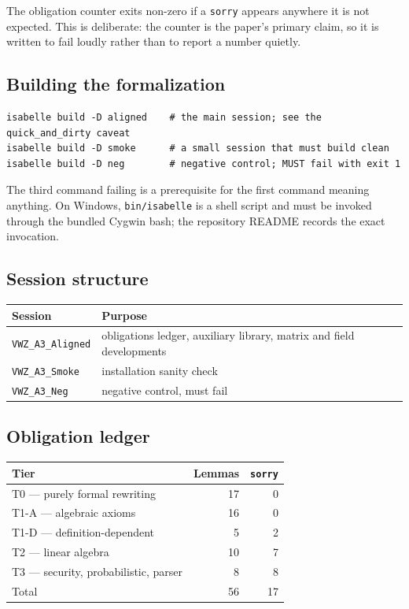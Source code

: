 The obligation counter exits non-zero if a \texttt{sorry} appears anywhere it is
not expected. This is deliberate: the counter is the paper's primary claim, so it
is written to fail loudly rather than to report a number quietly.

\subsection{Building the formalization}

\begin{lstlisting}
isabelle build -D aligned    # the main session; see the quick_and_dirty caveat
isabelle build -D smoke      # a small session that must build clean
isabelle build -D neg        # negative control; MUST fail with exit 1
\end{lstlisting}

The third command failing is a prerequisite for the first command meaning
anything. On Windows, \texttt{bin/isabelle} is a shell script and must be invoked
through the bundled Cygwin bash; the repository README records the exact
invocation.

\subsection{Session structure}

\begin{center}
\begin{tabular}{@{}ll@{}}
\toprule
Session & Purpose \\
\midrule
\texttt{VWZ\_A3\_Aligned} & obligations ledger, auxiliary library, matrix and field developments \\
\texttt{VWZ\_A3\_Smoke} & installation sanity check \\
\texttt{VWZ\_A3\_Neg} & negative control, must fail \\
\bottomrule
\end{tabular}
\end{center}

\subsection{Obligation ledger}

\begin{center}
\begin{tabular}{@{}lrr@{}}
\toprule
Tier & Lemmas & \texttt{sorry} \\
\midrule
T0 --- purely formal rewriting & 17 & 0 \\
T1-A --- algebraic axioms & 16 & 0 \\
T1-D --- definition-dependent & 5 & 2 \\
T2 --- linear algebra & 10 & 7 \\
T3 --- security, probabilistic, parser & 8 & 8 \\
\midrule
Total & 56 & 17 \\
\bottomrule
\end{tabular}
\end{center}


